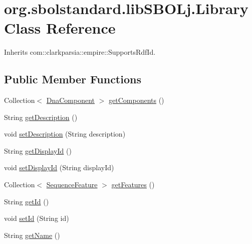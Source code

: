 \hypertarget{classorg_1_1sbolstandard_1_1lib_s_b_o_lj_1_1_library}{
\section{org.sbolstandard.libSBOLj.Library Class Reference}
\label{classorg_1_1sbolstandard_1_1lib_s_b_o_lj_1_1_library}
}


Inherits com::clarkparsia::empire::SupportsRdfId.

\subsection*{Public Member Functions}
\begin{DoxyCompactItemize}
\item 
Collection$<$ \hyperlink{classorg_1_1sbolstandard_1_1lib_s_b_o_lj_1_1_dna_component}{DnaComponent} $>$ \hyperlink{classorg_1_1sbolstandard_1_1lib_s_b_o_lj_1_1_library_a8738a163d2c83255f906dad48a44e260}{getComponents} ()
\item 
String \hyperlink{classorg_1_1sbolstandard_1_1lib_s_b_o_lj_1_1_library_ad4935054c95da4f9939ed824567ec984}{getDescription} ()
\item 
void \hyperlink{classorg_1_1sbolstandard_1_1lib_s_b_o_lj_1_1_library_a6f0d4c5fed91ca4e08896e07e46ae80d}{setDescription} (String description)
\item 
String \hyperlink{classorg_1_1sbolstandard_1_1lib_s_b_o_lj_1_1_library_a47510ab239dfd2f5cde80db8761bc8ea}{getDisplayId} ()
\item 
void \hyperlink{classorg_1_1sbolstandard_1_1lib_s_b_o_lj_1_1_library_a2c4a35fe2570648b10dcaaf10446a577}{setDisplayId} (String displayId)
\item 
Collection$<$ \hyperlink{classorg_1_1sbolstandard_1_1lib_s_b_o_lj_1_1_sequence_feature}{SequenceFeature} $>$ \hyperlink{classorg_1_1sbolstandard_1_1lib_s_b_o_lj_1_1_library_a12682cbad0f89c35435d903038743896}{getFeatures} ()
\item 
String \hyperlink{classorg_1_1sbolstandard_1_1lib_s_b_o_lj_1_1_library_a98da83bad419811087a5b06bc4869027}{getId} ()
\item 
void \hyperlink{classorg_1_1sbolstandard_1_1lib_s_b_o_lj_1_1_library_a935cbad6ab76005bd38cfa791b2a759a}{setId} (String id)
\item 
String \hyperlink{classorg_1_1sbolstandard_1_1lib_s_b_o_lj_1_1_library_a7f9c3f4e0e98634609f01238a32f8d81}{getName} ()
\item 

\end{DoxyCompactItemize}
